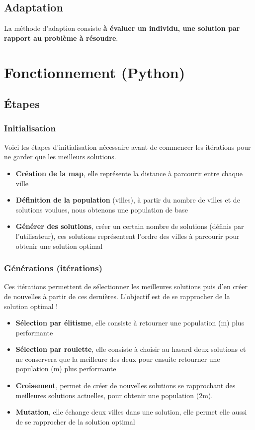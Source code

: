 \documentclass[12pt]{report}
\begin{document}
\section{Adaptation}

La méthode d'adaption consiste \textbf{à évaluer un individu, une solution par rapport au problème à résoudre}.

\cleardoublepage
\chapter{Fonctionnement (Python)}

\section{Étapes}

\subsection{Initialisation}
Voici les étapes d'initialisation nécessaire avant de commencer les itérations pour ne garder que les meilleurs solutions.\\
\begin{itemize}
\item \textbf{Création de la map}, elle représente la distance à parcourir entre chaque ville
\item \textbf{Définition de la population} (villes), à partir du nombre de villes et de solutions voulues, nous obtenons
une population de base
\item \textbf{Générer des solutions}, créer un certain nombre de solutions (définis par l'utilisateur), ces solutions représentent l'ordre des villes à parcourir pour obtenir une solution optimal
\end{itemize}

\subsection{Générations (itérations)}
Ces itérations permettent de sélectionner les meilleures solutions puis d'en créer de nouvelles à partir de ces dernières. L'objectif est de se rapprocher de la solution optimal !\\
\begin{itemize}
 \item \textbf{Sélection par élitisme}, elle consiste à retourner une population (m) plus performante
\item \textbf{Sélection par roulette}, elle consiste à choisir au hasard deux solutions et ne conservera
que la meilleure des deux pour ensuite retourner une population (m) plus performante
\item \textbf{Croisement}, permet de créer de nouvelles solutions se rapprochant des meilleures solutions actuelles, pour obtenir une population (2m). 
\item \textbf{Mutation}, elle échange deux villes dans une solution, elle permet elle aussi de se rapprocher de la solution optimal
\end{itemize}
\end{document}
